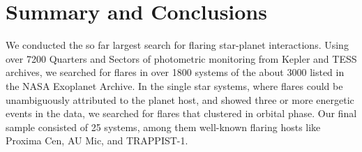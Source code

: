 \documentclass[twocolumn]{aastex631}
\begin{document}




\section{Summary and Conclusions}
\label{sec:summary}

We conducted the so far largest search for flaring star-planet interactions. Using over 7200 Quarters and Sectors of photometric monitoring from Kepler and TESS archives, we searched for flares in over 1800 systems of the about 3000 listed in the NASA Exoplanet Archive. In the single star systems, where flares could be unambiguously attributed to the planet host, and showed three or more energetic events in the data, we searched for flares that clustered in orbital phase. Our final sample consisted of 25 systems, among them well-known flaring hosts like Proxima Cen, AU Mic, and TRAPPIST-1. 
\end{document}
